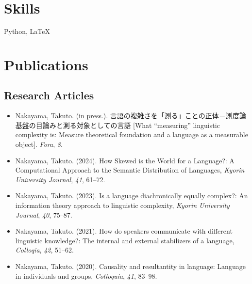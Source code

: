 \documentclass[a4paper,11pt]{article}
\begin{document}
\vspace{1em}

\section*{Skills}
  \hspace{0.5em} Python, \LaTeX

\vspace{1em}

\section*{Publications}
\subsection*{Research Articles}
\begin{itemize}[leftmargin=*, itemsep=0em, topsep=0em]
  \item Nakayama, Takuto. (in press.). 言語の複雑さを「測る」ことの正体－測度論基盤の目論みと測る対象としての言語 [What ``measuring'' linguistic complexity is: Measure theoretical foundation and a language as a measurable object]. \textit{Fora}, \textit{8}. 
  \item  Nakayama, Takuto. (2024). How Skewed is the World for a Language?: A Computational Approach to the Semantic Distribution of Languages, \textit{Kyorin University Journal}, \textit{41}, 61–72. 
  \item Nakayama, Takuto. (2023). Is a language diachronically equally complex?: An information theory approach to linguistic complexity, \textit{Kyorin University Journal}, \textit{40}, 75–87. 
  \item Nakayama, Takuto. (2021). How do speakers communicate with different linguistic knowledge?: The internal and external stabilizers of a language, \textit{Colloqia}, \textit{42}, 51–62.
  \item Nakayama, Takuto. (2020). Causality and resultantity in language: Language in individuals and groups, \textit{Colloquia}, \textit{41}, 83–98.
\end{itemize}
\end{document}
